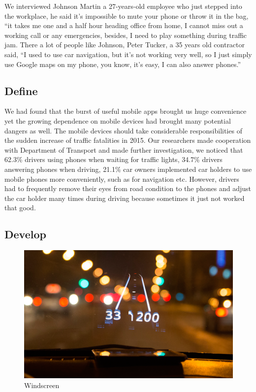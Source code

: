 \documentclass{chi-ext}
\begin{document}
\begin{multicols}{2}
We interviewed Johnson Martin a 27-years-old employee who just stepped into the workplace, he said it’s impossible to mute your phone or throw it in the bag, “it takes me one and a half hour heading office from home, I cannot miss out a working call or any emergencies, besides, I need to play something during traffic jam. There a lot of people like Johnson, Peter Tucker, a 35 years old contractor said, “I used to use car navigation, but it’s not working very well, so I just simply use Google maps on my phone, you know, it’s easy, I can also answer phones.” \\

\subsection{Define}
We had found that the burst of useful mobile apps brought us huge convenience yet the growing dependence on mobile devices had brought many potential dangers as well. The mobile devices should take considerable responsibilities of the sudden increase of traffic fatalities in 2015. Our researchers made cooperation with Department of Transport and made further investigation, we noticed that 62.3\% drivers using phones when waiting for traffic lights, 34.7\% drivers answering phones when driving, 21.1\% car owners implemented car holders to use mobile phones more conveniently, such as for navigation etc. However, drivers had to frequently remove their eyes from road condition to the phones and adjust the car holder many times during driving because sometimes it just not worked that good.\\

\subsection{Develop}

\begin{figure}
\centering
  \includegraphics[width=0.7\columnwidth]{windscreen.png}
  \caption{Windscreen}
  \centering
 \label{fig:windscreen}
\end{figure}


\end{multicols}
\end{document}
